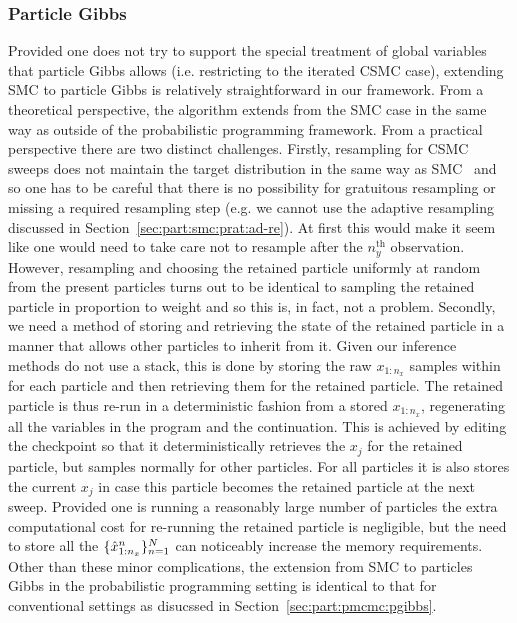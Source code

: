 \subsubsection{Particle Gibbs}
\label{sec:proginf:str:part:pgibbs}

Provided one does not try to support the special treatment of global variables that particle
Gibbs allows (i.e. restricting to the iterated CSMC case), extending SMC to particle Gibbs
is relatively straightforward in our framework.  From a theoretical perspective, the algorithm
extends from the SMC case in the same way as outside of the probabilistic programming framework.
From a practical perspective there are two distinct challenges. Firstly, resampling for CSMC
sweeps does not maintain the target distribution in the same way as SMC~\citep{holenstein2009particle} and so one has
to be careful that there is no possibility for gratuitous resampling or missing a required resampling step (e.g. 
we cannot use the adaptive resampling discussed in Section~\ref{sec:part:smc:prat:ad-re}).
At first this would make it
seem like one would need to take care not to resample after the $n_y^{\mathrm{th}}$ observation.
However, resampling and choosing the retained particle uniformly at random from the
present particles turns out to be identical to sampling the retained particle in proportion to weight and
so this is, in fact, not a problem.  Secondly, we need a method of storing and retrieving the
state of the retained particle in a manner that allows other particles to inherit from it.  Given our
inference methods do not use a stack, this is done by storing the raw $x_{1:n_x}$ samples within
\angstate for each particle and then retrieving them for the retained particle.  The retained
particle is thus re-run in a deterministic fashion from a stored $x_{1:n_x}$, regenerating
all the variables in the program and the continuation.  This is achieved by
editing the \sample checkpoint so that it deterministically retrieves the $x_j$ for the 
retained particle, but samples normally for other particles.  For all particles it is also stores the current
$x_j$ in case this particle becomes the retained particle at the next sweep.
Provided one is running a reasonably large number of particles the extra computational cost for
re-running the retained particle is negligible, but the need to store all the $\{\hat{x}_{1:n_x}^n\}_{n=1}^{N}$
can noticeably increase the memory requirements.  Other than these minor complications, the
extension from SMC to particles Gibbs in the probabilistic programming setting is identical to
that for conventional settings as disucssed in Section~\ref{sec:part:pmcmc:pgibbs}.

